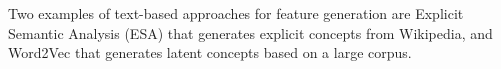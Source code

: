 \documentclass[letterpaper]{article} %
\theoremstyle{definition}
\begin{document}
Two examples of text-based approaches for feature generation are 
Explicit Semantic Analysis (ESA) \cite{gabrilovich2009wikipediafull} that generates explicit concepts from Wikipedia, and Word2Vec \cite{mikolov2013distributed} that generates latent concepts based on a large corpus. 


\end{document}
